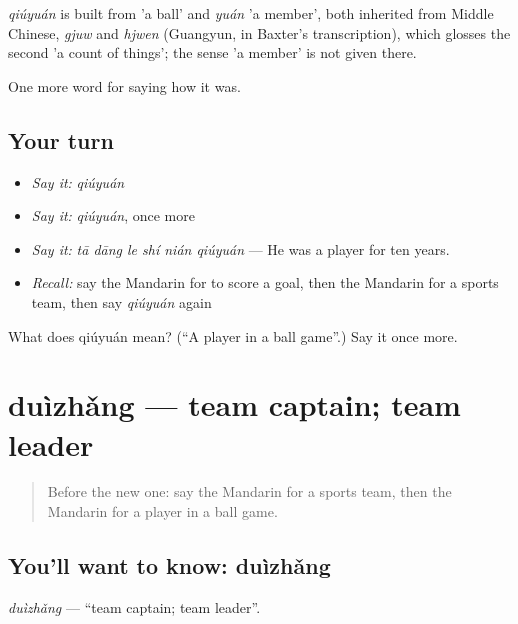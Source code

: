 \begin{cousinweb}
\emph{qiúyuán} is built from  'a ball' and \emph{yuán} 'a member', both inherited from Middle Chinese, \emph{gjuw} and \emph{hjwen} (Guangyun, in Baxter's transcription), which glosses the second 'a count of things'; the sense 'a member' is not given there.
\end{cousinweb}

\begin{grammarlens}[title={What you've built}]
One more word for saying how it was.
\end{grammarlens}

\subsection*{Your turn}
\begin{itemize}
\raggedright
  \item \emph{Say it:} \emph{qiúyuán}
  \item \emph{Say it:} \emph{qiúyuán}, once more
  \item \emph{Say it:} \emph{tā dāng le shí nián qiúyuán} — He was a player for ten years.
  \item \emph{Recall:} say the Mandarin for to score a goal, then the Mandarin for a sports team, then say \emph{qiúyuán} again
\end{itemize}

\begin{tcolorbox}[breakable,colback=teal!4,colframe=teal!35!black,title={Before you move on}]
What does qiúyuán mean? (\textquotedblleft{}A player in a ball game\textquotedblright{}.) Say it once more.
\end{tcolorbox}
\section[duìzhǎng]{duìzhǎng — team captain; team leader}

\label{lesson:ZH-C499-duizhang}



\begin{quote}
Before the new one: say the Mandarin for a sports team, then the Mandarin for a player in a ball game.
\end{quote}

\subsection*{You'll want to know: duìzhǎng}
\emph{duìzhǎng} — \textquotedblleft{}team captain; team leader\textquotedblright{}.

